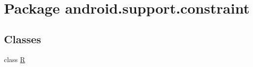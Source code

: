 \hypertarget{namespaceandroid_1_1support_1_1constraint}{}\section{Package android.\+support.\+constraint}
\label{namespaceandroid_1_1support_1_1constraint}
\subsection*{Classes}
\begin{DoxyCompactItemize}
\item 
class \mbox{\hyperlink{classandroid_1_1support_1_1constraint_1_1R}{R}}
\end{DoxyCompactItemize}

